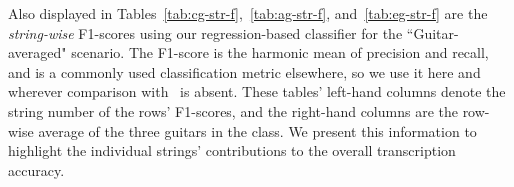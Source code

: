 \documentclass[12pt]{cmuthesis}
\begin{document}

Also displayed in Tables~\ref{tab:cg-str-f},~\ref{tab:ag-str-f}, and~\ref{tab:eg-str-f} are the \textit{string-wise} F1-scores using our regression-based classifier for the ``Guitar-averaged" scenario. The F1-score is the harmonic mean of precision and recall, and is a commonly used classification metric elsewhere, so we use it here and wherever comparison with~\cite{barbanchoi2012} is absent. These tables' left-hand columns denote the string number of the rows' F1-scores, and the right-hand columns are the row-wise average of the three guitars in the class. We present this information to highlight the individual strings' contributions to the overall transcription accuracy.
\end{document}
